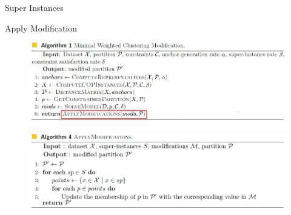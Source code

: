 \documentclass{beamer}
\begin{document}
\begin{frame}{Super Instances}

    \begin{figure}
        \centering
    \end{figure}
    
\end{frame}

\begin{frame}{Apply Modification}
    \begin{figure}
        \centering
        \includegraphics[width=\textwidth]{./images/apply.jpg}
    \end{figure}
    \begin{figure}
        \centering
        \includegraphics[width=\textwidth]{./images/modification.jpg}
    \end{figure}
\end{frame}
\end{document}
